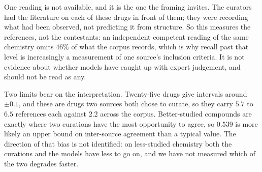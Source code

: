 One reading is not available, and it is the one the framing invites. The curators had the literature
on each of these drugs in front of them; they were recording what had been observed, not predicting
it from structure. So this measures the references, not the contestants: an independent competent
reading of the same chemistry omits $46\%$ of what the corpus records, which is why recall past that
level is increasingly a measurement of one source's inclusion criteria. It is not evidence about
whether models have caught up with expert judgement, and should not be read as any.

Two limits bear on the interpretation. Twenty-five drugs give intervals
around $\pm0.1$, and these are drugs two sources both chose to curate, so they carry $5.7$ to $6.5$
references each against $2.2$ across the corpus. Better-studied compounds are exactly where two
curations have the most opportunity to agree, so $0.539$ is more likely an upper bound on
inter-source agreement than a typical value. The direction of that bias is not identified: on
less-studied chemistry both the curations and the models have less to go on, and we have not
measured which of the two degrades faster.
